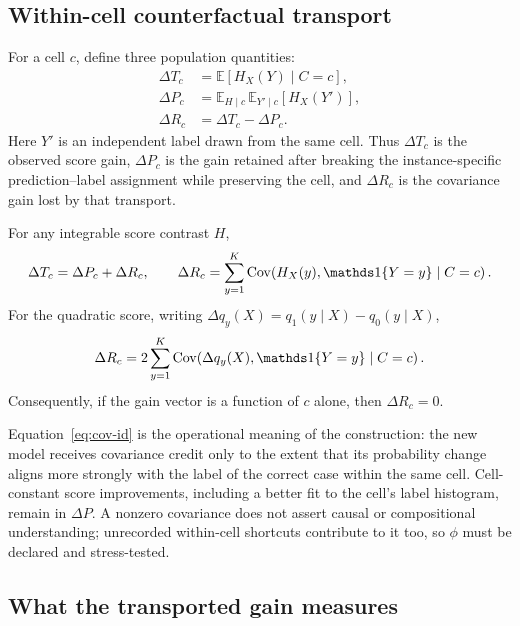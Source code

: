 \subsection{Within-cell counterfactual transport}\label{sec:transport}

For a cell $c$, define three population quantities:
\begin{align}
\Delta T_c &= \mathbb E[H_X(Y)\mid C=c], \\
\Delta P_c &= \mathbb E_{H\mid c}\,\mathbb E_{Y'\mid c}[H_X(Y')], \\
\Delta R_c &= \Delta T_c-\Delta P_c .
\end{align}
Here $Y'$ is an independent label drawn from the same cell. Thus $\Delta T_c$ is the
observed score gain, $\Delta P_c$ is the gain retained after breaking the
instance-specific prediction--label assignment while preserving the cell, and
$\Delta R_c$ is the covariance gain lost by that transport.

\begin{theorem}\label{thm:population}
For any integrable score contrast $H$,
\begin{equation}
\Delta T_c=\Delta P_c+\Delta R_c,
\qquad
\Delta R_c=\sum_{y=1}^K
\operatorname{Cov}\!\left(H_X(y),\ind \{Y=y\}\mid C=c\right).
\label{eq:population-id}
\end{equation}
For the quadratic score, writing $\Delta q_y(X)=q_1(y\mid X)-q_0(y\mid X)$,
\begin{equation}
\Delta R_c=2\sum_{y=1}^K
\operatorname{Cov}\!\left(\Delta q_y(X),\ind \{Y=y\}\mid C=c\right).
\label{eq:cov-id}
\end{equation}
Consequently, if the gain vector is a function of $c$ alone, then $\Delta R_c=0$.
\end{theorem}

Equation~\eqref{eq:cov-id} is the operational meaning of the construction: the new model
receives covariance credit only to the extent that its probability change aligns more
strongly with the label of the correct case within the same cell. Cell-constant score
improvements, including a better fit to the cell's label histogram, remain in $\Delta P$. A
nonzero covariance does not assert causal or compositional understanding; unrecorded
within-cell shortcuts contribute to it too, so $\phi$ must be declared and stress-tested.

\subsection{What the transported gain measures}\label{sec:transported}

